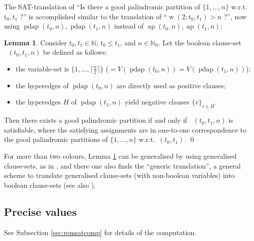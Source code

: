 \documentclass[final,3p,times]{elsarticle}
\theoremstyle{definition}
\newtheorem{lem}{Lemma}[section]
\newcommand{\set}[1]{\{#1\}}
\renewcommand{\leq}{\le} %
\newcommand{\ol}{\overline}
\newcommand{\NN}{\mathbb{N}}
\newcommand{\NNZ}{\NN_0}
\newcommand{\ceil}[1]{\lceil #1 \rceil}
\DeclareMathOperator{\vdw}{w}
\DeclareMathOperator{\arithp}{ap}
\DeclareMathOperator{\pdarithp}{pdap}
\DeclareMathOperator{\Fpd}{\mathit{F}^{pd}}
\begin{document}
The SAT-translation of ``Is there a good palindromic partition of $\set{1,\dots,n}$ w.r.t.\ $t_0,t_1$ ?'' is accomplished similar to the translation of ``$\vdw(2;t_0,t_1) > n$ ?'', now using $\pdarithp(t_0,n), \pdarithp(t_1,n)$ instead of $\arithp(t_0,n), \arithp(t_1,n)$:
\begin{lem}\label{lem:pdsat}
  Consider $t_0, t_1 \in \NN$, $t_0 \leq t_1$, and $n \in \NNZ$. Let the boolean clause-set $\Fpd(t_0,t_1,n)$ be defined as follows:
  \begin{itemize}
  \item the variable-set is $\set{1,\dots,\ceil{\frac n2}}$ ($ = V(\pdarithp(t_0,n)) = V(\pdarithp(t_1,n))$);
  \item the hyperedges of $\pdarithp(t_0,n)$ are directly used as positive clauses;
  \item the hyperedges $H$ of $\pdarithp(t_1,n)$ yield negative clauses $\set{\ol{v}}_{v \in H}$.
  \end{itemize}
  Then there exists a good palindromic partition if and only if $\Fpd(t_0,t_1,n)$ is satisfiable, where the satisfying assignments are in one-to-one correspondence to the good palindromic partitions of $\set{1,\dots,n}$ w.r.t.\ $(t_0,t_1)$. \qed
\end{lem}
For more than two colours, Lemma \ref{lem:pdsat} can be generalised by using generalised clause-sets, as in \cite{kullmann}, and there one also finds the ``generic translation'', a general scheme to translate generalised clause-sets (with non-boolean variables) into boolean clause-sets (see also \cite{Kullmann2007ClausalFormZI,Kullmann2007ClausalFormZII}).



\subsection{Precise values}
\label{sec:Palindromespv}

See Subsection \ref{sec:remsatcomp} for details of the computation.
\end{document}
